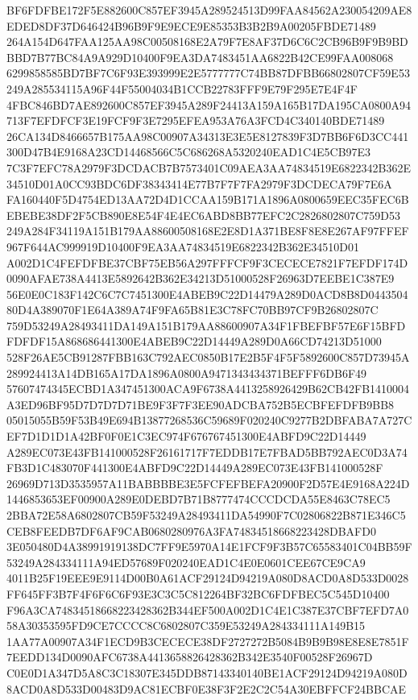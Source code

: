 \documentclass[UTF8,fontset=fandol,zihao=-4,a4paper]{ctexart}
\begin{document}
{{BF6FDFBE172F5E882600C857EF3945A289524513D99FAA84562A230054209AE8EDED8DF37D646424B96B9F9E9ECE9E85353B3B2B9A00205FBDE71489
264A154D647FAA125AA98C00508168E2A79F7E8AF37D6C6C2CB96B9F9B9BDBBD7B77BC84A9A929D10400F9EA3DA7483451AA6822B42CE99FAA008068
6299858585BD7BF7C6F93E393999E2E5777777C74BB87DFBB66802807CF59E53249A285534115A96F44F55004034B1CCB22783FFF9E79F295E7E4F4F
4FBC846BD7AE892600C857EF3945A289F24413A159A165B17DA195CA0800A94713F7EFDFCF3E19FCF9F3E7295EFEA953A76A3FCD4C340140BDE71489
26CA134D8466657B175AA98C00907A34313E3E5E8127839F3D7BB6F6D3CC441300D47B4E9168A23CD14468566C5C686268A5320240EAD1C4E5CB97E3
7C3F7EFC78A2979F3DCDACB7B7573401C09AEA3AA74834519E6822342B362E34510D01A0CC93BDC6DF38343414E77B7F7F7FA2979F3DCDECA79F7E6A
FA160440F5D4754ED13AA72D4D1CCAA159B171A1896A0800659EEC35FEC6BEBEBE38DF2F5CB890E8E54F4E4EC6ABD8BB77EFC2C2826802807C759D53
249A284F34119A151B179AA88600508168E2E8D1A371BE8F8E8E267AF97FFEF967F644AC999919D10400F9EA3AA74834519E6822342B362E34510D01
A002D1C4FEFDFBE37CBF75EB56A297FFFCF9F3CECECE7821F7EFDF174D0090AFAE738A4413E5892642B362E34213D51000528F26963D7EEBE1C387E9
56E0E0C183F142C6C7C7451300E4ABEB9C22D14479A289D0ACD8B8D044350480D4A389070F1E64A389A74F9FA65B81E3C78FC70BB97CF9B26802807C
759D53249A28493411DA149A151B179AA88600907A34F1FBEFBF57E6F15BFDFDFDF15A868686441300E4ABEB9C22D14449A289D0A66CD74213D51000
528F26AE5CB91287FBB163C792AEC0850B17E2B5F4F5F5892600C857D73945A289924413A14DB165A17DA1896A0800A9471343434371BEFFF6DB6F49
57607474345ECBD1A347451300ACA9F6738A4413258926429B62CB42FB1410004A3ED96BF95D7D7D7D71BE9F3F7F3EE90ADCBA752B5ECBFEFDFB9BB8
05015055B59F53B49E694B13877268536C59689F020240C9277B2DBFABA7A727CEF7D1D1D1A42BF0F0E1C3EC974F676767451300E4ABFD9C22D14449
A289EC073E43FB141000528F26161717F7EDDB17E7FBAD5BB792AEC0D3A74FB3D1C483070F441300E4ABFD9C22D14449A289EC073E43FB141000528F
26969D713D3535957A11BABBBBE3E5FCFEFBEFA20900F2D57E4E9168A224D1446853653EF00900A289E0DEBD7B71B8777474CCCDCDA55E8463C78EC5
2BBA72E58A6802807CB59F53249A28493411DA54990F7C02806822B871E346C5CEB8FEEDB7DF6AF9CAB0680280976A3FA74834518668223428DBAFD0
3E050480D4A38991919138DC7FF9E5970A14E1FCF9F3B57C65583401C04BB59F53249A284334111A94ED57689F020240EAD1C4E0E0601CEE67CE9CA9
4011B25F19EEE9E9114D00B0A61ACF29124D94219A080D8ACD0A8D533D0028FF645FF3B7F4F6F6C6F93E3C3C5C812264BF32BC6FDFBEC5C545D10400
F96A3CA74834518668223428362B344EF500A002D1C4E1C387E37CBF7EFD7A058A30353595FD9CE7CCCC8C6802807C359E53249A284334111A149B15
1AA77A00907A34F1ECD9B3CECECE38DF2727272B5084B9B9B98E8E8E7851F7EEDD134D0090AFC6738A4413658826428362B342E3540F00528F26967D
C0E0D1A347D5A8C3C18307E345DDB87143340140BE1ACF29124D94219A080D8ACD0A8D533D00483D9AC81ECBF0E38F3F2E2C2C54A30EBFFCF24BBCAE
}}
\end{document}
